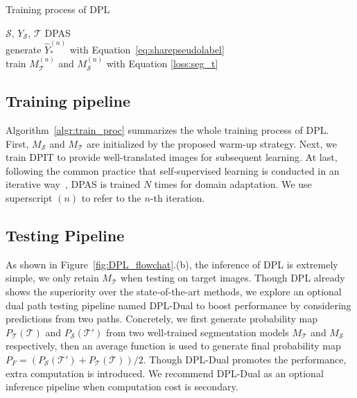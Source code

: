 \documentclass[10pt,twocolumn,letterpaper]{article}
\begin{document}
\begin{algorithm}[b]
	\vspace{-0.1cm}
\caption{Training process of DPL}\label{algr:train_proc}
\begin{algorithmic}
    \Require ${\mathcal{S}}$, ${Y_\mathcal{S}}$, ${\mathcal{T}}$
 DPAS\\
    \hspace{\algorithmicindent}generate $\hat{Y}_*^{(n)}$ with Equation~\ref{eq:sharepseudolabel} \\
        \hspace{\algorithmicindent}train $M_{\mathcal{T}}^{(n)}$ and $M_{\mathcal{S}}^{(n)}$ with Equation \ref{loss:seg_t} 
\EndFor 
\end{algorithmic}
\end{algorithm}

\subsection{Training pipeline}
\label{section:trainpipeline}
Algorithm~\ref{algr:train_proc} summarizes the whole training process of DPL. First, ${M_{\mathcal{S}}}$ and ${M_{\mathcal{T}}}$ are initialized by the proposed warm-up strategy. Next, we train DPIT to provide well-translated images for subsequent learning. At last, following the common practice that self-supervised learning is conducted in an iterative way~\cite{li2019bidirectional,zou2019confidence,Two-phase}, DPAS is trained $N$ times for domain adaptation. We use superscript $(n)$ to refer to the $n$-th iteration.
 

\subsection{Testing Pipeline}
\label{section:testpipeline}
As shown in Figure~\ref{fig:DPL_flowchat}.(b), the inference of DPL is extremely simple, we only retain $M_{\mathcal{T}}$ when testing on target images. Though DPL already shows the superiority over the state-of-the-art methods, we explore an optional dual path testing pipeline named DPL-Dual to boost performance by considering predictions from two paths. Concretely, we first generate probability map $P_{\mathcal{T}}(\mathcal{T})$ and $P_{\mathcal{S}}(\mathcal{T}')$ from two well-trained segmentation models $M_{\mathcal{T}}$ and $M_{\mathcal{S}}$ respectively, then an average function is used to generate final probability map $P_F = (P_{\mathcal{S}}(\mathcal{T}') + P_{\mathcal{T}}(\mathcal{T}))/2$. Though DPL-Dual promotes the performance, extra computation is introduced. We recommend DPL-Dual as an optional inference pipeline when computation cost is secondary.
\end{document}
